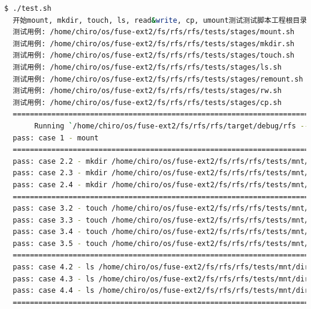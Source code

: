\begin{lstlisting}[language=bash]
  $ ./test.sh
  开始mount, mkdir, touch, ls, read&write, cp, umount测试测试脚本工程根目录: /home/chiro/os/fuse-ext2/fs/rfs/rfs/tests
  测试用例: /home/chiro/os/fuse-ext2/fs/rfs/rfs/tests/stages/mount.sh
  测试用例: /home/chiro/os/fuse-ext2/fs/rfs/rfs/tests/stages/mkdir.sh
  测试用例: /home/chiro/os/fuse-ext2/fs/rfs/rfs/tests/stages/touch.sh
  测试用例: /home/chiro/os/fuse-ext2/fs/rfs/rfs/tests/stages/ls.sh
  测试用例: /home/chiro/os/fuse-ext2/fs/rfs/rfs/tests/stages/remount.sh
  测试用例: /home/chiro/os/fuse-ext2/fs/rfs/rfs/tests/stages/rw.sh
  测试用例: /home/chiro/os/fuse-ext2/fs/rfs/rfs/tests/stages/cp.sh
  ============================================================================================================================    Finished dev [unoptimized + debuginfo] target(s) in 0.05s
       Running `/home/chiro/os/fuse-ext2/fs/rfs/rfs/target/debug/rfs --device=/home/chiro/ddriver -q /home/chiro/os/fuse-ext2/fs/rfs/rfs/tests/mnt`
  pass: case 1 - mount
  ============================================================================================================================pass: case 2.1 - mkdir /home/chiro/os/fuse-ext2/fs/rfs/rfs/tests/mnt/dir0
  pass: case 2.2 - mkdir /home/chiro/os/fuse-ext2/fs/rfs/rfs/tests/mnt/dir0/dir0
  pass: case 2.3 - mkdir /home/chiro/os/fuse-ext2/fs/rfs/rfs/tests/mnt/dir0/dir0/dir0
  pass: case 2.4 - mkdir /home/chiro/os/fuse-ext2/fs/rfs/rfs/tests/mnt/dir1
  ============================================================================================================================pass: case 3.1 - touch /home/chiro/os/fuse-ext2/fs/rfs/rfs/tests/mnt/file0
  pass: case 3.2 - touch /home/chiro/os/fuse-ext2/fs/rfs/rfs/tests/mnt/file1
  pass: case 3.3 - touch /home/chiro/os/fuse-ext2/fs/rfs/rfs/tests/mnt/dir0/file1
  pass: case 3.4 - touch /home/chiro/os/fuse-ext2/fs/rfs/rfs/tests/mnt/dir0/file2
  pass: case 3.5 - touch /home/chiro/os/fuse-ext2/fs/rfs/rfs/tests/mnt/dir1/file3
  ============================================================================================================================pass: case 4.1 - ls /home/chiro/os/fuse-ext2/fs/rfs/rfs/tests/mnt/
  pass: case 4.2 - ls /home/chiro/os/fuse-ext2/fs/rfs/rfs/tests/mnt/dir0
  pass: case 4.3 - ls /home/chiro/os/fuse-ext2/fs/rfs/rfs/tests/mnt/dir0/dir1
  pass: case 4.4 - ls /home/chiro/os/fuse-ext2/fs/rfs/rfs/tests/mnt/dir0/dir1/dir2
  ============================================================================================================================    Finished dev [unoptimized + debuginfo] target(s) in 0.05s

\end{lstlisting}
